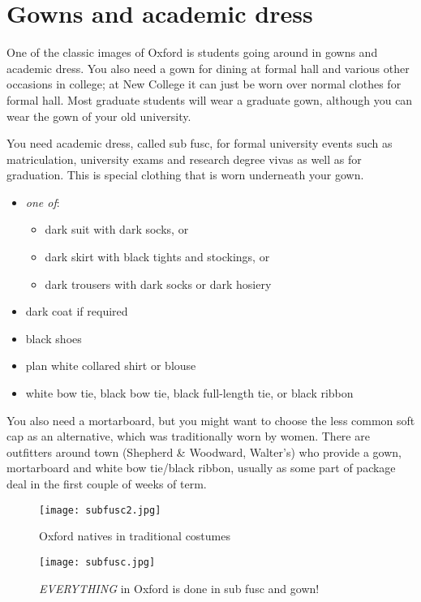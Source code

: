\section{Gowns and academic dress}\label{AcaDress}
One of the classic images of Oxford is students going around in gowns and academic dress. You also need a gown for dining at formal hall and various other occasions in college; at New College it can just be worn over normal clothes for formal hall. Most graduate students will wear a graduate gown, although you can wear the gown of your old university. 

You need academic dress, called sub fusc, for formal university events such as
matriculation, university exams and research degree vivas as well as for
graduation. This is special clothing that is worn underneath your gown. 
\begin{itemize}

\item \emph{one of}: 
\begin{itemize}
\item dark suit with dark socks, or
\item dark skirt with black tights and stockings, or
\item dark trousers with dark socks or dark hosiery
\end{itemize}
\item dark coat if required
\item black shoes
\item plan white collared shirt or blouse
\item white bow tie, black bow tie, black full-length tie, or black ribbon
\end{itemize}

You also need a mortarboard, but you might want to choose the less common soft cap as an alternative, which was traditionally worn by women. There are outfitters around town (Shepherd \& Woodward, Walter's) who provide a gown, mortarboard and white bow tie/black ribbon, usually as some part of package deal in the first couple of weeks of term.


\begin{figure}[htbp]
\centering
		\begin{minipage}{0.58\textwidth}
        	\centering
				\texttt{[image: subfusc2.jpg]}
				\caption[]{Oxford natives in traditional costumes}
				\label{fig:subfusc}
        \end{minipage}%
        \quad
		\begin{minipage}{0.38\textwidth}
        	\centering
				\texttt{[image: subfusc.jpg]}
				\caption[]{\emph{EVERYTHING} in Oxford is done in sub fusc and
				gown!}
				\label{fig:slack}
        \end{minipage}%
\end{figure}  
  

